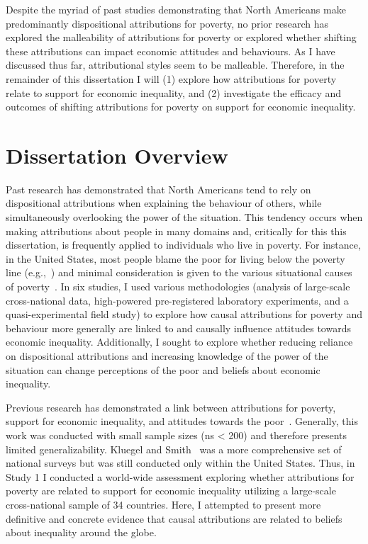 \documentclass{sfuthesis}
\begin{document}
Despite the myriad of past studies demonstrating that North Americans make predominantly dispositional attributions for poverty, no prior research has explored the malleability of attributions for poverty or explored whether shifting these attributions can impact economic attitudes and behaviours. As I have discussed thus far, attributional styles seem to be malleable. Therefore, in the remainder of this dissertation I will (1) explore how attributions for poverty relate to support for economic inequality, and (2) investigate the efficacy and outcomes of shifting attributions for poverty on support for economic inequality.

\section{Dissertation Overview}

Past research has demonstrated that North Americans tend to rely on dispositional attributions when explaining the behaviour of others, while simultaneously overlooking the power of the situation. This tendency occurs when making attributions about people in many domains and, critically for this this dissertation, is frequently applied to individuals who live in poverty. For instance, in the United States, most people blame the poor for living below the poverty line (e.g.,~\cite{feather74, cozzarelli01}) and minimal consideration is given to the various situational causes of poverty~\cite{davidai16}. In six studies, I used various methodologies (analysis of large-scale cross-national data, high-powered pre-registered laboratory experiments, and a quasi-experimental field study) to explore how causal attributions for poverty and behaviour more generally are linked to and causally influence attitudes towards economic inequality. Additionally, I sought to explore whether reducing reliance on dispositional attributions and increasing knowledge of the power of the situation can change perceptions of the poor and beliefs about economic inequality.

Previous research has demonstrated a link between attributions for poverty, support for economic inequality, and attitudes towards the poor~\cite{bullock03, cozzarelli01, kluegel86, zucker93}. Generally, this work was conducted with small sample sizes (ns < 200) and therefore presents limited generalizability. Kluegel and Smith~\cite{kluegel86} was a more comprehensive set of national surveys but was still conducted only within the United States. Thus, in Study 1 I conducted a world-wide assessment exploring whether attributions for poverty are related to support for economic inequality utilizing a large-scale cross-national sample of 34 countries. Here, I attempted to present more definitive and concrete evidence that causal attributions are related to beliefs about inequality around the globe.
\end{document}
